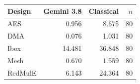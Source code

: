 \begin{tabular}{lrrr}
\toprule
Design & Gemini 3.8 & Classical & $n$ \\
\midrule
AES & 0.956 & 8.675 & 80 \\
DMA & 0.076 & 1.031 & 80 \\
Ibex & 14.481 & 36.848 & 80 \\
Mesh & 0.670 & 1.559 & 80 \\
RedMulE & 6.143 & 24.364 & 80 \\
\bottomrule
\end{tabular}
